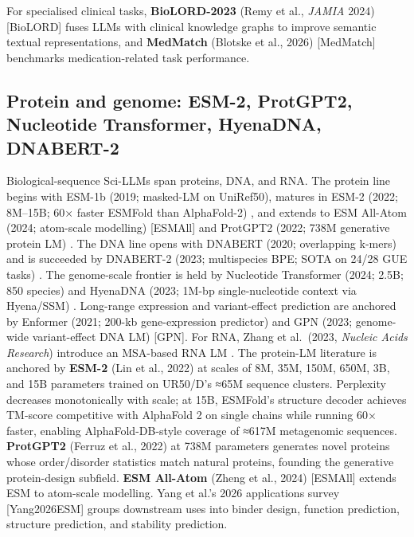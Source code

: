 \documentclass{article}
\begin{document}
For specialised clinical tasks, \textbf{BioLORD-2023} (Remy et al., \emph{JAMIA} 2024) {[}BioLORD{]} fuses LLMs with clinical knowledge graphs to improve semantic textual representations, and \textbf{MedMatch} (Blotske et al., 2026) {[}MedMatch{]} benchmarks medication-related task performance.

\subsection{Protein and genome: ESM-2, ProtGPT2, Nucleotide Transformer, HyenaDNA, DNABERT-2}\label{protein-and-genome-esm-2-protgpt2-nucleotide-transformer-hyenadna-dnabert-2}

Biological-sequence Sci-LLMs span proteins, DNA, and RNA. The protein line begins with ESM-1b (2019; masked-LM on UniRef50), matures in ESM-2 (2022; 8M--15B; 60× faster ESMFold than AlphaFold-2) \cite{lin2022evolutionaryscalep}, and extends to ESM All-Atom (2024; atom-scale modelling) {[}ESMAll{]} and ProtGPT2 (2022; 738M generative protein LM) \cite{ferruz2022naturecommunicatio}. The DNA line opens with DNABERT (2020; overlapping k-mers) \cite{ji2020biorxiv2020} and is succeeded by DNABERT-2 (2023; multispecies BPE; SOTA on 24/28 GUE tasks) \cite{zhou2023arxiv2306150062023}. The genome-scale frontier is held by Nucleotide Transformer (2024; 2.5B; 850 species) \cite{dallatorre2024nucleotidetransfor} and HyenaDNA (2023; 1M-bp single-nucleotide context via Hyena/SSM) \cite{nguyen2023hyenadnalongrangeg}. Long-range expression and variant-effect prediction are anchored by Enformer (2021; 200-kb gene-expression predictor) \cite{avsec2021effectivegeneexpre} and GPN (2023; genome-wide variant-effect DNA LM) {[}GPN{]}. For RNA, Zhang et al.~(2023, \emph{Nucleic Acids Research}) introduce an MSA-based RNA LM \cite{zhang2023multiplesequenceal}. The protein-LM literature is anchored by \textbf{ESM-2} (Lin et al., 2022) \cite{lin2022evolutionaryscalep} at scales of 8M, 35M, 150M, 650M, 3B, and 15B parameters trained on UR50/D's ≈65M sequence clusters. Perplexity decreases monotonically with scale; at 15B, ESMFold's structure decoder achieves TM-score competitive with AlphaFold 2 on single chains while running 60× faster, enabling AlphaFold-DB-style coverage of ≈617M metagenomic sequences. \textbf{ProtGPT2} (Ferruz et al., 2022) \cite{ferruz2022naturecommunicatio} at 738M parameters generates novel proteins whose order/disorder statistics match natural proteins, founding the generative protein-design subfield. \textbf{ESM All-Atom} (Zheng et al., 2024) {[}ESMAll{]} extends ESM to atom-scale modelling. Yang et al.'s 2026 applications survey {[}Yang2026ESM{]} groups downstream uses into binder design, function prediction, structure prediction, and stability prediction.
\end{document}
